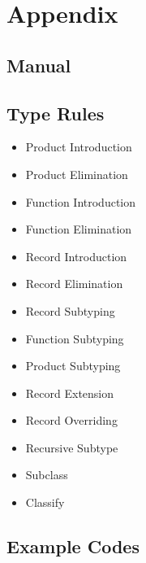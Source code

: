 \printnomenclature

\appendix
\part*{Appendix}

\chapter{Manual}


\chapter{Type Rules}
\label{ctr:typeRules}
\begin{itemize}
\item Product Introduction
\item Product Elimination
\item Function Introduction
\item Function Elimination
\item Record Introduction
\item Record Elimination
\item Record Subtyping
\item Function Subtyping
\item Product Subtyping
\item Record Extension
\item Record Overriding
\item Recursive Subtype
\item Subclass
\item Classify
\end{itemize}

\chapter{Example Codes}
\label{ctr:exampleCode}

